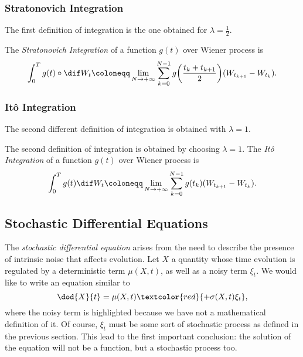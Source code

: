 \subsubsection{Stratonovich Integration}
The first definition of integration is the one obtained for \(\lambda=\frac12\).
\begin{Definition}
  The \emph{Stratonovich Integration} of a function \(g{(t)}\) over Wiener process is
  \[\int_0^T g{(t)}\circ\dif W_t \coloneqq \lim_{N\to+\infty} \sum_{k=0}^{N-1}g{\left(\frac{t_{k}+t_{k+1}}{2}\right)}(W_{t_{k+1}}-W_{t_k}).\]
\end{Definition}

\subsubsection{Itô Integration}
The second different definition of integration is obtained with \(\lambda=1\).
\begin{Definition}
  The second definition of integration is obtained by choosing \(\lambda=1\).
  The \emph{Itô Integration} of a function \(g{(t)}\) over Wiener process is
  \[\int_0^T g{(t)}\dif W_t \coloneqq \lim_{N\to+\infty} \sum_{k=0}^{N-1}g{(t_k)}(W_{t_{k+1}}-W_{t_k}).\]
\end{Definition}

\subsection{Stochastic Differential Equations}
The \emph{stochastic differential equation} arises from the need to describe the
presence of intrinsic noise that affects evolution. Let \(X\) a quantity whose
time evolution is regulated by a deterministic term \(\mu{(X,t)}\), as well as a noisy
term \(\xi_t\). We would like to write an equation similar to
\[\dod{X}{t} = \mu{(X,t)} \textcolor{red}{+ \sigma{(X,t)}\xi_t},\]
where the noisy term is highlighted because we have not a mathematical definition
of it. Of course, \(\xi_t\) must be some sort of stochastic process as defined in 
the previous section. This lead to the first important conclusion: the solution of the
equation will not be a function, but a stochastic process too.

